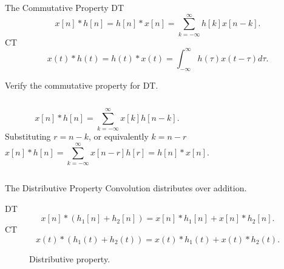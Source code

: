 \begin{frame}{The Commutative Property}
    DT
    \begin{equation*}
        x[n]\ast h[n] = h[n] \ast x[n] = \sum_{k=-\infty}^{\infty}h[k]x[n-k].
    \end{equation*}
    CT
    \begin{equation*}
        x(t)\ast h(t) = h(t) \ast x(t) = \int_{-\infty}^{\infty}h(\tau)x(t-\tau)d\tau.
    \end{equation*}

    Verify the commutative property for DT.
    \pause
    {
        \begin{columns}
                \begin{equation*}
                    x[n]\ast h[n] = \sum_{k=-\infty}^{\infty}x[k]h[n-k].
                \end{equation*}
                Substituting $r = n-k$, or equivalently $k = n-r$
                \pause
                \begin{equation*}
                    x[n]\ast h[n] = \sum_{k=-\infty}^{\infty}x[n-r]h[r] = h[n]\ast x[n].
                \end{equation*}
        \end{columns}
    }
\end{frame}

\begin{frame}{The Distributive Property}
Convolution distributes over addition.\par
    DT
    \begin{equation*}
        x[n]\ast (h_1[n] + h_2[n]) = x[n]\ast h_1[n] + x[n]\ast  h_2[n].
    \end{equation*}
    CT
    \begin{equation*}
        x(t)\ast (h_1(t) + h_2(t)) = x(t)\ast h_1(t) + x(t)\ast  h_2(t).
    \end{equation*}


    {
        \begin{figure}
          \centering
          
          \caption{Distributive property.}\label{fi:distributive_property}
        \end{figure}
    }
\end{frame}



